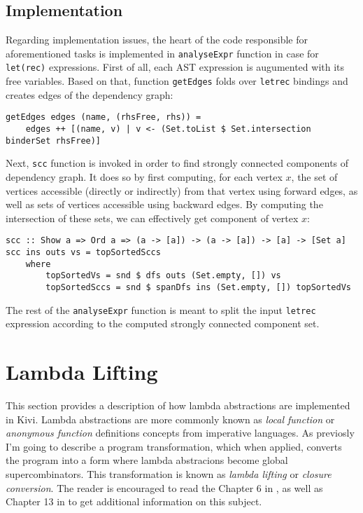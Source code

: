 \documentclass[12pt,a4paper]{report}
\begin{document}
\subsection{Implementation}
Regarding implementation issues, the heart of the code responsible for
aforementioned tasks is implemented in \texttt{analyseExpr} function in case
for \texttt{let(rec)} expressions. First of all, each AST expression is
augumented with its free variables. Based on that, function \texttt{getEdges}
folds over \texttt{letrec} bindings and creates edges of the dependency graph:

\hspace*{-1.5in}
\begin{lstlisting}[style=haskell]
getEdges edges (name, (rhsFree, rhs)) =
    edges ++ [(name, v) | v <- (Set.toList $ Set.intersection binderSet rhsFree)]
\end{lstlisting}

Next, \texttt{scc} function is invoked in order to find strongly connected
components of dependency graph. It does so by first computing, for each vertex
$x$, the set of vertices accessible (directly or indirectly) from that vertex
using forward edges, as well as sets of vertices accessible using backward
edges. By computing the intersection of these sets, we can effectively get
component of vertex $x$:

\hspace*{-1.5in}
\begin{lstlisting}[style=haskell]
scc :: Show a => Ord a => (a -> [a]) -> (a -> [a]) -> [a] -> [Set a]
scc ins outs vs = topSortedSccs
    where
        topSortedVs = snd $ dfs outs (Set.empty, []) vs
        topSortedSccs = snd $ spanDfs ins (Set.empty, []) topSortedVs
\end{lstlisting}

The rest of the \texttt{analyseExpr} function is meant to split the input
\texttt{letrec} expression according to the computed strongly connected
component set.

\section{Lambda Lifting}
This section provides a description of how lambda abstractions are implemented
in Kivi. Lambda abstractions are more commonly known as \textit{local function}
or \textit{anonymous function} definitions concepts from imperative languages.
As previosly I'm going to describe a program transformation, which when
applied, converts the program into a form where lambda abstracions become
global supercombinators. This transformation is known as \textit{lambda
lifting} or \textit{closure conversion}. The reader is encouraged to read the
Chapter 6 in \cite{JonLes00}, as well as Chapter 13 in \cite{Jon87} to
get additional information on this subject.
\end{document}
